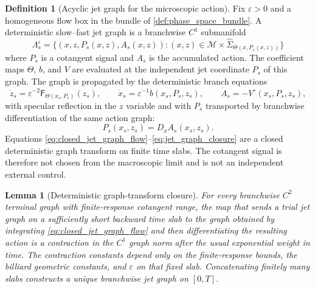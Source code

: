 \documentclass[12pt, letterpaper]{amsart}
\newcommand{\Mcal}{\mathcal{M}}
\newcommand{\Ffast}{\mathsf F}
\theoremstyle{plain}
\newtheorem{lemma}[theorem]{Lemma}
\theoremstyle{definition}
\newtheorem{definition}[theorem]{Definition}
\theoremstyle{remark}
\begin{document}
\begin{definition}[Acyclic jet graph for the microscopic action]
\label{def:acyclic_jet_graph}
Fix $\varepsilon>0$ and a homogeneous flow box in the bundle of
\cref{def:phase_space_bundle}.  A deterministic slow--fast jet graph is a
branchwise $C^1$ submanifold
\begin{equation}
    \Lambda_s^\varepsilon
    =\{(x,z,P_s(x,z),A_s(x,z)): (x,z)\in\Mcal\times\widehat\Sigma_{\Theta(x,P_s(x,z))}\}
\end{equation}
where $P_s$ is a cotangent signal and $A_s$ is the accumulated action.  The
coefficient maps $\Theta$, $b$, and $V$ are evaluated at the independent jet
coordinate $P_s$ of this graph.  The graph is propagated by the deterministic
branch equations
\begin{equation}
\label{eq:closed_jet_graph_flow}
    \dot z_s=\varepsilon^{-2}\Ffast_{\Theta(x_s,P_s)}(z_s),
    \qquad
    \dot x_s=\varepsilon^{-1}b(x_s,P_s,z_s),
    \qquad
    \dot A_s= -V^\circ(x_s,P_s,z_s),
\end{equation}
with specular reflection in the $z$ variable and with $P_s$ transported by
branchwise differentiation of the same action graph:
\begin{equation}
\label{eq:jet_graph_closure}
    P_s(x_s,z_s)=D_x A_s(x_s,z_s).
\end{equation}
Equations \eqref{eq:closed_jet_graph_flow}--\eqref{eq:jet_graph_closure} are a
closed deterministic graph transform on finite time slabs.  The cotangent
signal is therefore not chosen from the macroscopic limit and is not an
independent external control.
\end{definition}

\begin{lemma}[Deterministic graph-transform closure]
\label{lem:deterministic_graph_transform_closure}
For every branchwise $C^2$ terminal graph with finite-response cotangent range,
the map that sends a trial jet graph on a sufficiently short backward time slab
to the graph obtained by integrating \eqref{eq:closed_jet_graph_flow} and then
differentiating the resulting action is a contraction in the $C^1$ graph norm
after the usual exponential weight in time.  The contraction constants depend
only on the finite-response bounds, the billiard geometric constants, and
$\varepsilon$ on that fixed slab.  Concatenating finitely many slabs constructs a
unique branchwise jet graph on $[0,T]$.
\end{lemma}
\end{document}
